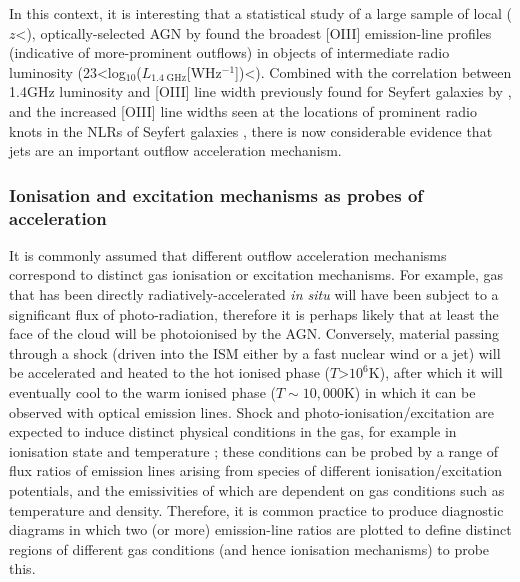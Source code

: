 In this context, it is interesting that a statistical study of a large sample of local ($z$\;\textless{}), optically-selected AGN by \citet{Mullaney2013} found the broadest [OIII] emission-line profiles (indicative of more-prominent outflows) in objects of intermediate radio luminosity (23\;\textless\;log$_{10}$($L_\mathrm{1.4\;GHz}$[W\;Hz$^{-1}$])\;\textless{}). Combined with the correlation between 1.4\;GHz luminosity and [OIII] line width previously found for Seyfert galaxies by \citet{Whittle1992c}, and the increased [OIII] line widths seen at the locations of prominent radio knots in the NLRs of Seyfert galaxies \citep{Whittle1988}, there is now considerable evidence that jets are an important outflow acceleration mechanism.

\subsubsection{Ionisation and excitation mechanisms as probes of acceleration}
\label{section: introduction: outflows: accleration_mechanisms: ionisation_and_excitation_mechanisms}

It is commonly assumed that different outflow acceleration mechanisms correspond to distinct gas ionisation or excitation mechanisms. For example, gas that has been directly radiatively-accelerated \textit{in situ} will have been subject to a significant flux of photo-radiation, therefore it is perhaps likely that at least the face of the cloud will be photoionised by the AGN. Conversely, material passing through a shock (driven into the ISM either by a fast nuclear wind or a jet) will be accelerated and heated to the hot ionised phase ($T$\;\textgreater\;$10^6$\;K), after which it will eventually cool to the warm ionised phase ($T\sim10,000$\;K) in which it can be observed with optical emission lines. Shock and photo-ionisation/excitation are expected to induce distinct physical conditions in the gas, for example in ionisation state and temperature \citep{Fosbury1978, Binette1996, VillarMartin1999}; these conditions can be probed by a range of flux ratios of emission lines arising from species of different ionisation/excitation potentials, and the emissivities of which are dependent on gas conditions such as temperature and density. Therefore, it is common practice to produce diagnostic diagrams in which two (or more) emission-line ratios are plotted to define distinct regions of different gas conditions (and hence ionisation mechanisms) to probe this.

